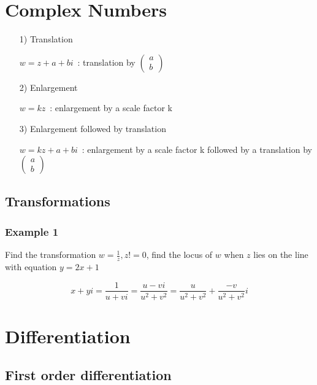 \documentclass[a4paper,9pt]{scrartcl}
\begin{document}
    \section{Complex Numbers}\label{sec:complex-numbers}

    \begin{itemize}
        \item [1)] Translation

        $w=z+a+bi$\ : translation by
        $\begin{pmatrix}
             a \\b
        \end{pmatrix}$

        \item [2)] Enlargement

        $w=kz$\ : enlargement by a scale factor k

        \item [3)] Enlargement followed by translation

        $w=kz+a+bi$\ : enlargement by a scale factor k followed by a translation by
        $\begin{pmatrix}
             a \\b
        \end{pmatrix}$
    \end{itemize}

    \subsection{Transformations}

    \subsubsection{Example 1}
    Find the transformation $w = \frac{1}{z}, z != 0$, find the locus of $w$ when $z$ lies on the line with equation $y = 2x + 1$

    \begin{displaymath}
        x + yi = \frac{1}{u + vi} = \frac{u - vi}{u^2 + v^2} = \frac{u}{u^2+v^2} + \frac{-v}{u^2+v^2}i
    \end{displaymath}


    \section{Differentiation}

    \subsection{First order differentiation}
\end{document}
